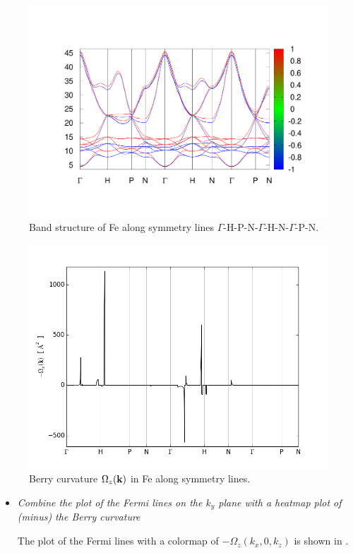 \begin{figure}[b!]
\centering
\includegraphics[width=0.8\columnwidth,trim={50pt 80pt 50pt 80pt},clip]{figure/example18/Fe_bandstructure.pdf}
\caption{Band structure of Fe along symmetry lines $\Gamma$-H-P-N-$\Gamma$-H-N-$\Gamma$-P-N.}
\label{fig18.1}
\end{figure}
\clearpage

\begin{figure}[t!]
\centering
\includegraphics[width=0.7\columnwidth]{figure/example18/Fe_Berry_phase.png}
\caption{Berry curvature $\Omega_z(\bfk)$ in Fe along symmetry lines.}\label{fig18.2}
\end{figure}

\begin{itemize}
	\item {\it Combine the plot of the Fermi lines on the $k_y$ plane with a heatmap plot of (minus) the Berry curvature}

	The plot of the Fermi lines with a colormap of $-\Omega_z(k_x,0,k_z)$ is shown in .
\end{itemize}

